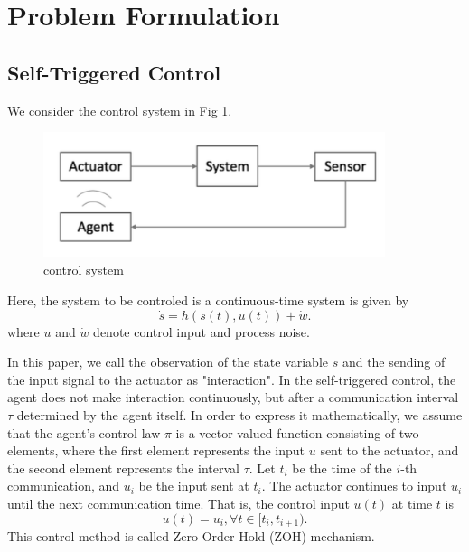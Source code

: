 \documentclass[english, dvipdfmx]{ampmt}             %
\begin{document}
\section{Problem Formulation}
\subsection{Self-Triggered Control}
We consider the control system in Fig \ref{image}.
\begin{figure}[t]
	\centering
 	\includegraphics[width=10cm]{event.png}
 	\caption{control system} \label{image}
\end{figure}
Here, the system to be controled is a continuous-time system is given by
\begin{equation}
	\dot{s} = h(s(t),u(t)) + \dot{w}\label{continuous_system}.
\end{equation}
where $u$ and $\dot{w}$ denote control input and process noise.\par
In this paper, we call the observation of the state variable $s$ and the sending of the input signal to the actuator as "interaction". In the self-triggered control, the agent does not make interaction continuously, but after a communication interval $\tau$ determined by the agent itself. In order to express it mathematically, we assume that the agent's control law $\pi$ is a vector-valued function consisting of two elements, where the first element represents the input $u$ sent to the actuator, and the second element represents the interval $\tau$. Let $t_i$ be the time of the $i$-th communication, and $u_i$ be the input sent at $t_i$. The actuator continues to input $u_i$ until the next communication time. That is, the control input $u(t)$ at time $t$ is 
\begin{equation}
	u(t) = u_i, \forall t \in [t_i, t_{i+1}).
\end{equation} 
This control method is called Zero Order Hold (ZOH) mechanism.
\end{document}

